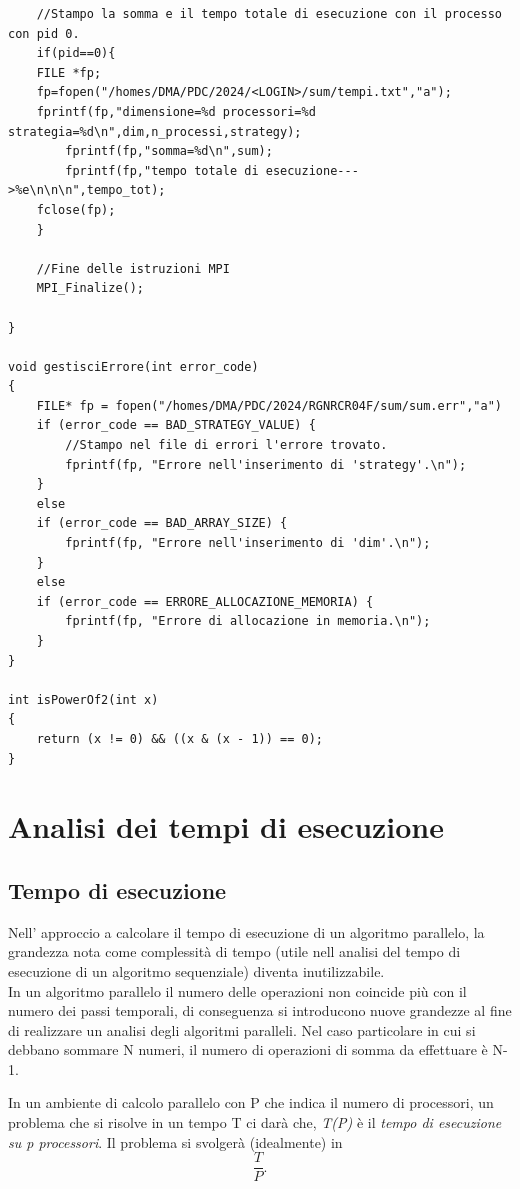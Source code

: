 \documentclass{article}
\begin{document}
\begin{lstlisting}
    //Stampo la somma e il tempo totale di esecuzione con il processo con pid 0.
    if(pid==0){
	FILE *fp;
	fp=fopen("/homes/DMA/PDC/2024/<LOGIN>/sum/tempi.txt","a");
	fprintf(fp,"dimensione=%d processori=%d strategia=%d\n",dim,n_processi,strategy);
        fprintf(fp,"somma=%d\n",sum);
        fprintf(fp,"tempo totale di esecuzione--->%e\n\n\n",tempo_tot);
	fclose(fp);
    }

    //Fine delle istruzioni MPI
    MPI_Finalize();

}

void gestisciErrore(int error_code)
{   
    FILE* fp = fopen("/homes/DMA/PDC/2024/RGNRCR04F/sum/sum.err","a")
    if (error_code == BAD_STRATEGY_VALUE) {
        //Stampo nel file di errori l'errore trovato.
        fprintf(fp, "Errore nell'inserimento di 'strategy'.\n");
    }
    else
    if (error_code == BAD_ARRAY_SIZE) {
        fprintf(fp, "Errore nell'inserimento di 'dim'.\n");
    }
    else
    if (error_code == ERRORE_ALLOCAZIONE_MEMORIA) {
        fprintf(fp, "Errore di allocazione in memoria.\n");
    }
}

int isPowerOf2(int x)
{
    return (x != 0) && ((x & (x - 1)) == 0);
}
\end{lstlisting}

\section{Analisi dei tempi di esecuzione}
\subsection{Tempo di esecuzione}

Nell' approccio a calcolare il tempo di esecuzione di un algoritmo parallelo, la grandezza nota come complessità di tempo (utile nell analisi del tempo di esecuzione di un algoritmo sequenziale) diventa inutilizzabile.\\
In un algoritmo parallelo il numero delle operazioni non coincide più con il numero dei passi temporali, di conseguenza si introducono nuove grandezze al fine di realizzare un analisi degli algoritmi paralleli. Nel caso particolare in cui si debbano sommare N numeri, il numero di operazioni di somma da effettuare è N-1.

In un ambiente di calcolo parallelo con P che indica il numero di processori, un problema che si risolve in un tempo T ci darà che, \textit{T(P)} è il \textit{tempo di esecuzione su p processori}. Il problema si svolgerà (idealmente) in $$ \frac{T}{P}. $$ \\
\end{document}
